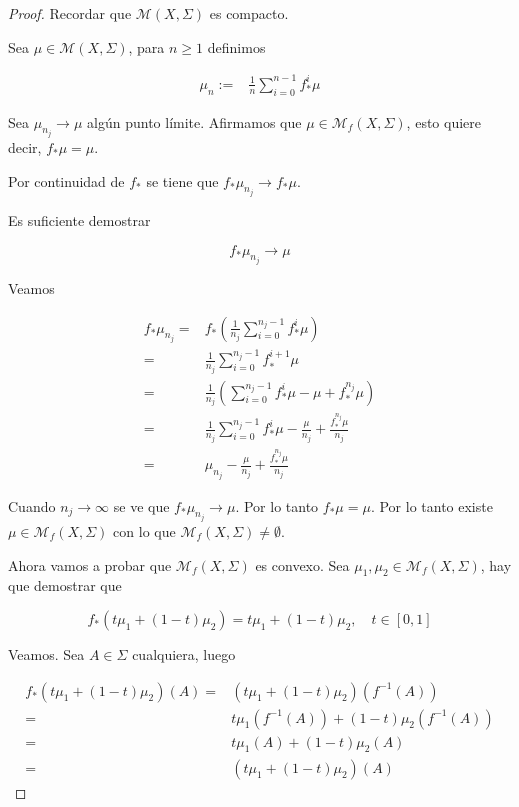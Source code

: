 \begin{proof}
	Recordar que $\mathcal{M}(X,\Sigma)$ es compacto.
	
	Sea $\mu \in \mathcal{M}(X,\Sigma)$, para $n \geq 1$ definimos
	
	\begin{align}
		\mu_n :=& \frac{1}{n} \sum_{i=0}^{n-1} f_*^i \mu
	\end{align}
	
		Sea $\mu_{n_j} \rightarrow \mu$ algún punto límite. Afirmamos que $\mu \in \mathcal{M}_f(X,\Sigma)$, esto quiere decir, $f_*\mu = \mu$.
	
	Por continuidad de $f_*$ se tiene que $f_*\mu_{n_j} \rightarrow f_*\mu$.
	
	Es suficiente demostrar
	
	\begin{equation}
	f_*\mu_{n_j} \rightarrow \mu
	\end{equation}
	
	Veamos
	
	\begin{align}
	f_*\mu_{n_j} =& f_* \left( \frac{1}{n_j} \sum_{i=0}^{n_j-1} f^i_* \mu \right)\\
	=& \frac{1}{n_j} \sum_{i=0}^{n_j-1} f_*^{i+1} \mu\\
	=& \frac{1}{n_j} \left( \sum_{i=0}^{n_j-1} f^i_* \mu - \mu + f^{n_j}_* \mu \right)\\
	=& \frac{1}{n_j} \sum_{i=0}^{n_j-1} f^i_* \mu - \frac{\mu}{n_j} + \frac{f^{n_j}_* \mu}{n_j}\\
	=& \mu_{n_j} - \frac{\mu}{n_j} + \frac{f^{n_j}_* \mu}{n_j}
	\end{align}
	
	Cuando $n_j \rightarrow \infty$ se ve que $f_* \mu_{n_j} \rightarrow \mu$. Por lo tanto $f_*\mu=\mu$. Por lo tanto existe $\mu \in \mathcal{M}_f(X,\Sigma)$ con lo que $\mathcal{M}_f(X,\Sigma) \neq \emptyset$.
	
	Ahora vamos a probar que $\mathcal{M}_f(X,\Sigma)$ es convexo. Sea $\mu_1,\mu_2 \in \mathcal{M}_f(X,\Sigma)$, hay que demostrar que
	
	\begin{equation}
	f_*(t\mu_1 + (1-t)\mu_2) = t\mu_1 + (1-t)\mu_2, \quad t \in [0,1]
	\end{equation}
	
	Veamos. Sea $A \in \Sigma$ cualquiera, luego 
	
	\begin{align}
	f_*(t\mu_1 + (1-t)\mu_2)(A) =& (t\mu_1 + (1-t)\mu_2)(f^{-1}(A))\\
	=& t\mu_1(f^{-1}(A)) + (1-t)\mu_2(f^{-1}(A))\\
	=& t\mu_1(A) + (1-t)\mu_2(A)\\
	=& (t\mu_1 + (1-t)\mu_2)(A)
	\end{align}
	

\end{proof}
